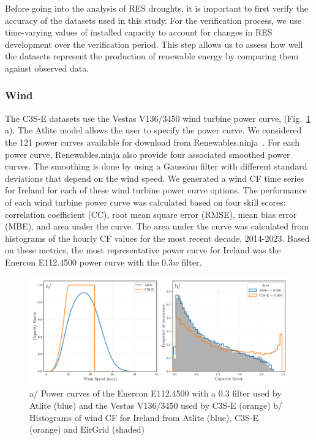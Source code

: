 \documentclass[a4paper, 11pt]{article}
\begin{document}
Before going into the analysis of RES droughts, it is important to first verify the accuracy of the datasets used in this study. For the verification process, we use time-varying values of installed capacity to account for changes in RES development over the verification period. This step allows us to assess how well the datasets represent the production of renewable energy by comparing them against observed data.
	
\subsubsection{Wind}
\label{sec:wind_verification}

The C3S-E datasets use the Vestas V136/3450 wind turbine power curve, (Fig.~\ref{fig:power_curve} a). The Atlite model allows the user to specify the power curve. We considered the 121 power curves available for download from Renewables.ninja~\cite{staffell2016wake}. For each power curve, Renewables.ninja also provide four associated smoothed power curves. The smoothing is done by using a Gaussian filter with different standard deviations that depend on the wind speed. We generated a wind CF time series for Ireland for each of these wind turbine power curve options. The performance of each wind turbine power curve was calculated based on four skill scores: correlation coefficient (CC), root mean square error (RMSE), mean bias error (MBE), and area under the curve. The area under the curve was calculated from histograms of the hourly CF values for the most recent decade, 2014-2023. Based on these metrics, the most representative power curve for Ireland was the Enercon E112.4500 power curve with the $0.3w$ filter.

\begin{figure}[!ht]
	\centering
	\includegraphics[width=\textwidth]{verification/power_curve}
	\caption{a/ Power curves of the Enercon E112.4500 with a 0.3 filter used by Atlite (blue) and the Vestas V136/3450 used by C3S-E (orange) b/ Histograms of wind CF for Ireland from Atlite (blue), C3S-E (orange) and EirGrid (shaded)}
	\label{fig:power_curve}
\end{figure}
\end{document}
